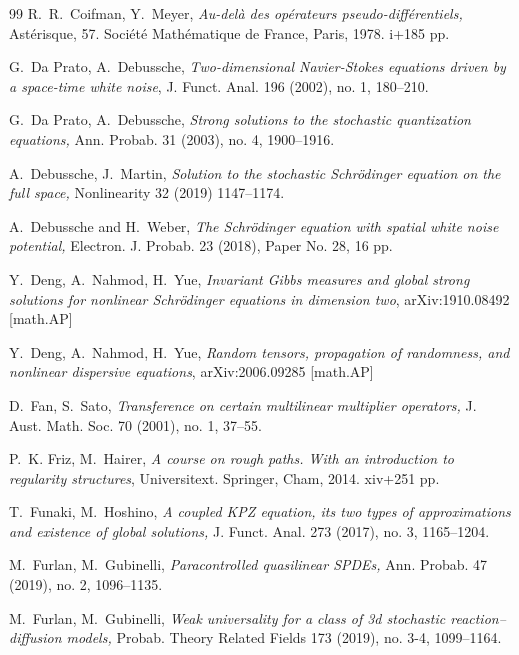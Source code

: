 \documentclass[%
11pt,  reqno]{amsart}
\newcommand{\1}{\hspace{0.2mm}\text{I}\hspace{0.2mm}}
\numberwithin{equation}{section}
\numberwithin{theorem}{section}
\begin{document}
\begin{thebibliography}{99}
R.~R.~Coifman,  Y.~Meyer,
{\it Au-del\`a des op\'erateurs pseudo-diff\'erentiels,} Ast\'erisque, 
 57. Soci\'et\'e Math\'ematique de France, Paris, 1978. i+185 pp. 
 



G.~Da Prato, A.~Debussche, 
{\it Two-dimensional Navier-Stokes equations driven by a space-time white noise}, 
J. Funct. Anal. 196 (2002), no. 1, 180--210.

G.~Da Prato, A.~Debussche, 
{\it Strong solutions to the stochastic quantization equations,} Ann. Probab. 31 (2003), no. 4, 1900--1916.


A.~Debussche,  J.~Martin,
{\it Solution to the stochastic {S}chr\"odinger equation on
  the full space,}
Nonlinearity
32 (2019) 1147--1174.

A.~Debussche and H.~Weber,
{\it The {Schr\"odinger} equation with spatial white noise potential,}
 Electron. J. Probab. 23 (2018), Paper No. 28, 16 pp.



Y.~Deng, A.~Nahmod, H.~Yue,
{\it Invariant Gibbs measures and global strong solutions for nonlinear Schr\"odinger equations in dimension two}, 
arXiv:1910.08492 [math.AP]


Y.~Deng, A.~Nahmod, H.~Yue,
{\it Random tensors, propagation of randomness, and nonlinear dispersive equations}, 
arXiv:2006.09285 [math.AP]

D.~Fan, S.~Sato, {\it Transference on certain multilinear multiplier operators,}
 J. Aust. Math. Soc. 70 (2001), no. 1, 37--55.

P.~K. Friz,  M.~Hairer,
{\it A course on rough paths.
With an introduction to regularity structures}, Universitext. Springer, Cham, 2014. xiv+251 pp.

T.~Funaki,  M.~Hoshino, {\it
A coupled KPZ equation, its two types of approximations and existence of global solutions,}
 J. Funct. Anal. 273 (2017), no. 3, 1165--1204. 


M.~Furlan,  M.~Gubinelli,
{\it Paracontrolled quasilinear {SPDEs},}
 Ann. Probab. 47 (2019), no. 2, 1096--1135. 


M.~Furlan,  M.~Gubinelli,
{\it Weak universality for a class of 3d stochastic reaction--diffusion
  models,}
 Probab. Theory Related Fields 173 (2019), no. 3-4, 1099--1164.





\end{thebibliography}
\end{document}
